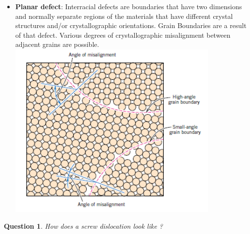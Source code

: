 \documentclass[13]{article}
\newtheorem{exer}{Question}
\begin{document}
\begin{itemize}
\begin{itemize}
\end{itemize}
\item \textbf{Planar defect}: Interracial defects are boundaries that have
	two dimensions and normally separate regions of the materials that
	have different crystal structures and/or crystallographic
	orientations.  Grain Boundaries are a result of that defect. Various degrees of crystallographic misalignment between adjacent grains are possible.
\\
\includegraphics[scale=0.5]{figures/5.png}
\end{itemize}
\begin{exer}
How does a screw dislocation look like ?
\end{exer}
\end{document}
